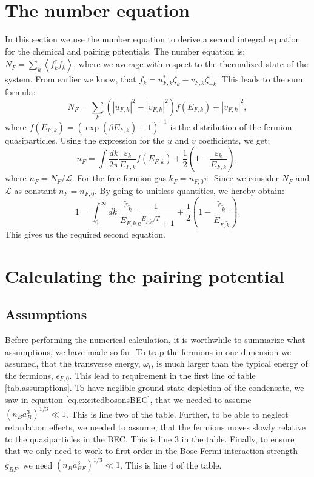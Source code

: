 \section{The number equation} \label{sec.chemicalpotential.numberequation}
In this section we use the number equation to derive a second integral equation for the chemical and pairing potentials. The number equation is: $N_F = \sum_k \left \langle f_k^\dagger f_k \right \rangle$, where we average with respect to the thermalized state of the system. From earlier we know, that $f_k = u_{F,k}^* \zeta_k -v_{F,k} \zeta_{-k}^\dagger$. This leads to the sum formula:
\begin{equation}
N_F = \sum_k \left(|u_{F,k}|^2-|v_{F,k}|^2\right) f(E_{F,k}) + |v_{F,k}|^2,\nonumber
\end{equation}
where $f(E_{F,k}) = (\exp(\beta E_{F,k}) + 1)^{-1}$ is the distribution of the fermion quasiparticles. Using the expression for the $u$ and $v$ coefficients, we get:
\begin{equation}
n_F = \int \frac{dk}{2\pi} \frac{\varepsilon_k}{E_{F,k}}f(E_{F,k}) + \frac{1}{2}\left(1 - \frac{\varepsilon_k}{E_{F,k}}\right), \nonumber
\end{equation}
where $n_F = N_F/\mathcal{L}$. For the free fermion gas $k_F = n_{F,0}\pi$. Since we consider $N_F$ and $\mathcal{L}$ as constant $n_F = n_{F,0}$. By going to unitless quantities, we hereby obtain:
\begin{equation}
1 = \int_0^\infty d\tilde{k} \; \frac{\tilde{\varepsilon}_{\tilde{k}}}{\tilde{E}_{F,k}}\frac{1}{\text{e}^{ \tilde{E}_{F,\tilde{k}}/\tilde{T} } + 1 } + \frac{1}{2}\left(1 - \frac{\tilde{\varepsilon}_{\tilde{k}}}{\tilde{E}_{F,\tilde{k}}}\right). 
\label{eq.NumberEquationUnitless}
\end{equation}
This gives us the required second equation.


\section{Calculating the pairing potential} \label{sec.pairingandchemicalpotential.numericalcalculation}
\subsection{Assumptions}
Before performing the numerical calculation, it is worthwhile to summarize what assumptions, we have made so far. To trap the fermions in one dimension we assumed, that the transverse energy, $\omega_t$, is much larger than the typical energy of the fermions, $\epsilon_{F,0}$. This lead to requirement in the first line of table \ref{tab.assumptions}. To have neglible ground state depletion of the condensate, we saw in equation \eqref{eq.excitedbosonsBEC}, that we needed to assume $(n_Ba_B^3)^{1/3}\ll 1$. This is line two of the table. Further, to be able to neglect retardation effects, we needed to assume, that the fermions moves slowly relative to the quasiparticles in the BEC. This is line 3 in the table. Finally, to ensure that we only need to work to first order in the Bose-Fermi interaction strength $g_{BF}$, we need $(n_Ba_{BF}^3)^{1/3} \ll 1$. This is line 4 of the table. 

